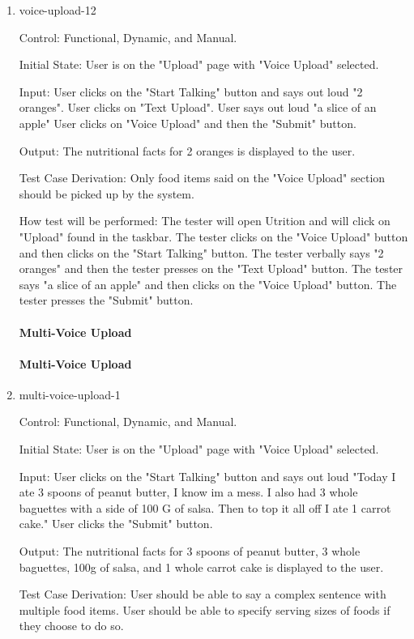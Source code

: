 \documentclass[12pt, titlepage]{article}
\begin{document}
\begin{enumerate}
	\item{voice-upload-12\\}
	
	Control: Functional, Dynamic, and Manual.
	
	Initial State: User is on the "Upload" page with "Voice Upload" selected.
	
	Input: User clicks on the "Start Talking" button and says out loud "2 oranges". User clicks on "Text Upload". User says out loud "a slice of an apple" User clicks on "Voice Upload" and then the "Submit" button.
	
	Output: The nutritional facts for 2 oranges is displayed to the user.
	
	Test Case Derivation: Only food items said on the "Voice Upload" section should be picked up by the system.
	
	How test will be performed: The tester will open Utrition and will click on "Upload" found in the taskbar. The tester clicks on the "Voice Upload" button and then clicks on the "Start Talking" button. The tester verbally says "2 oranges" and then the tester presses on the "Text Upload" button. The tester says "a slice of an apple" and then clicks on the "Voice Upload" button. The tester presses the "Submit" button.
		\paragraph{Multi-Voice Upload}
		\paragraph{Multi-Voice Upload}
	\item{multi-voice-upload-1\\}
	
	Control: Functional, Dynamic, and Manual.
	
	Initial State: User is on the "Upload" page with "Voice Upload" selected.
	
	Input: User clicks on the "Start Talking" button and says out loud "Today I ate 3 spoons of peanut butter, I know im a mess. I also had 3 whole baguettes with a side of 100 G of salsa. Then to top it all off I ate 1 carrot cake." User clicks the "Submit" button.
	
	Output: The nutritional facts for 3 spoons of peanut butter, 3 whole baguettes, 100g of salsa, and 1 whole carrot cake is displayed to the user.
	
	Test Case Derivation: User should be able to say a complex sentence with multiple food items. User should be able to specify serving sizes of foods if they choose to do so.
	

\end{enumerate}
\end{document}
